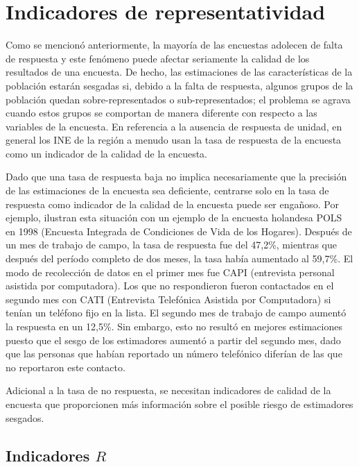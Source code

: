 \documentclass[
  12pt,
]{book}
\begin{document}
\hypertarget{indicadores-de-representatividad}{%
\section{Indicadores de representatividad}\label{indicadores-de-representatividad}}

Como se mencionó anteriormente, la mayoría de las encuestas adolecen de falta de respuesta y este fenómeno puede afectar seriamente la calidad de
los resultados de una encuesta. De hecho, las estimaciones de las características de la población estarán sesgadas si, debido a la falta de respuesta, algunos grupos de la población quedan sobre-representados o sub-representados; el problema se agrava cuando estos grupos
se comportan de manera diferente con respecto a las variables de la
encuesta. En referencia a la ausencia de respuesta de unidad, en general los INE de la región a menudo usan la tasa de respuesta de la encuesta como un indicador de la calidad de la encuesta.

Dado que una tasa de respuesta baja no implica necesariamente que la precisión de las estimaciones de la encuesta sea deficiente, centrarse solo en la tasa de respuesta como indicador de la calidad de la encuesta puede ser engañoso. Por ejemplo, \citet{Bethlehem_Cobben_Schouten_2009} ilustran esta situación con un ejemplo de la encuesta holandesa POLS en 1998 (Encuesta Integrada de Condiciones de Vida de los Hogares). Después de un mes de trabajo de campo, la tasa de respuesta fue del 47,2\%, mientras que después del período completo de dos meses, la tasa había aumentado al 59,7\%. El modo de recolección de datos en el primer mes fue CAPI (entrevista
personal asistida por computadora). Los que no respondieron fueron
contactados en el segundo mes con CATI (Entrevista Telefónica Asistida
por Computadora) si tenían un teléfono fijo en la lista. El segundo mes de trabajo de campo aumentó la respuesta en un 12,5\%. Sin embargo, esto no resultó en mejores estimaciones puesto que el sesgo de los estimadores aumentó a partir del segundo mes, dado que las personas que habían reportado un número telefónico diferían de las que no reportaron este contacto.

Adicional a la tasa de no respuesta, se necesitan indicadores
de calidad de la encuesta que proporcionen más información sobre el
posible riesgo de estimadores sesgados.

\hypertarget{indicadores-r}{%
\subsection{\texorpdfstring{Indicadores \(R\)}{Indicadores R}}\label{indicadores-r}}
\end{document}
